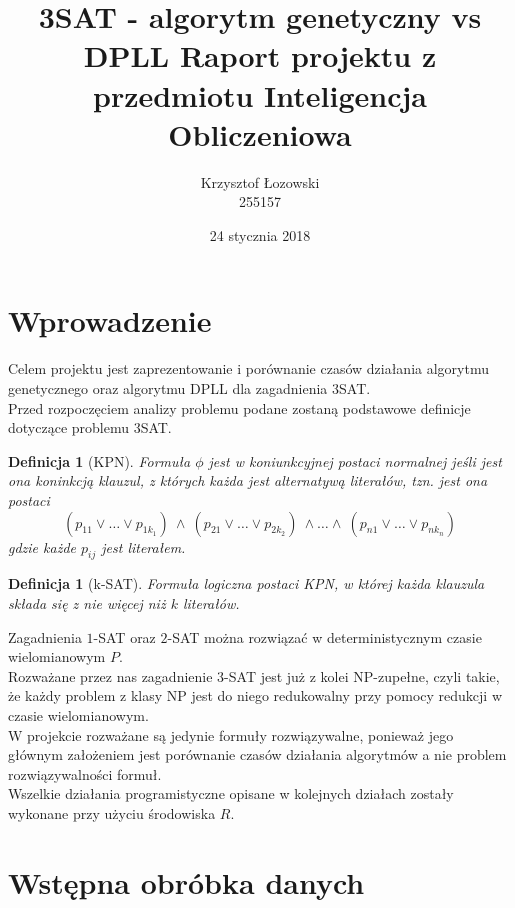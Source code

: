 \documentclass[11pt]{article}
\title{\textbf{3SAT - algorytm genetyczny vs DPLL}
\large Raport projektu z przedmiotu Inteligencja Obliczeniowa}
\author{Krzysztof Łozowski \\ 255157}
\date{24 stycznia 2018}
\theoremstyle{note}
\newtheorem{definition}[theorem]{Definicja}
\begin{document}
\maketitle

\section{Wprowadzenie}
Celem projektu jest zaprezentowanie i porównanie czasów działania algorytmu genetycznego oraz algorytmu DPLL dla zagadnienia 3SAT. \\
Przed rozpoczęciem analizy problemu podane zostaną podstawowe definicje dotyczące problemu 3SAT.

\begin{definition}[KPN]
Formuła $\phi$ jest w koniunkcyjnej postaci normalnej jeśli jest ona koninkcją klauzul, z których każda jest alternatywą literałów, tzn. jest ona postaci
  \begin{displaymath}
    (p_{11} \vee \ldots \vee p_{1k_{1}}) \ \wedge \ (p_{21} \vee \ldots \vee p_{2k_{2}}) \ \wedge \ldots \wedge \ (p_{n1} \vee \ldots \vee p_{nk_{n}})
  \end{displaymath}
gdzie każde $p_{ij}$ jest literałem.
\end{definition}

\begin{definition}[k-SAT]
  Formuła logiczna postaci KPN, w której każda klauzula składa się z nie więcej niż $k$ literałów.
\end{definition}

\noindent Zagadnienia $1$-SAT oraz $2$-SAT można rozwiązać w deterministycznym czasie wielomianowym $P$. \\
Rozważane przez nas zagadnienie $3$-SAT jest już z kolei NP-zupełne, czyli takie, że każdy problem z klasy NP jest do niego redukowalny przy pomocy redukcji w czasie wielomianowym. \\
W projekcie rozważane są jedynie formuły rozwiązywalne, ponieważ jego głównym założeniem jest porównanie czasów działania algorytmów a nie problem rozwiązywalności formuł. \\

\noindent Wszelkie działania programistyczne opisane w kolejnych działach zostały wykonane przy użyciu środowiska $R$.

\newpage
\section{Wstępna obróbka danych}
\end{document}
